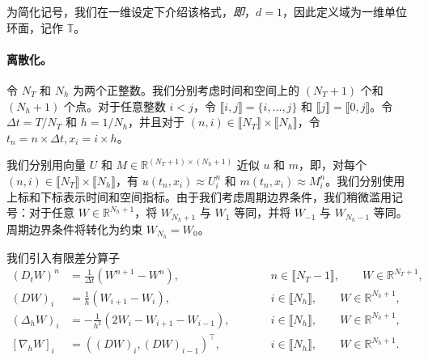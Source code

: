 \documentclass{amsproc}
\theoremstyle{definition}
\theoremstyle{remark}
\numberwithin{equation}{section}
\newcommand{\RR}{{\mathbb R}}
\newcommand{\TT}{{\mathbb T}}
\newcommand{\grad}{\nabla}
\begin{document}
为简化记号，我们在一维设定下介绍该格式，\textit{即}，$d=1$，因此定义域为一维单位环面，记作 $\TT$。






\paragraph{\textbf{离散化。} }

令 $N_T$ 和 $N_h$ 为两个正整数。我们分别考虑时间和空间上的 $(N_T+1)$ 个和 $(N_h+1)$ 个点。对于任意整数 $i < j$，令 $\llbracket i,j \rrbracket = \{i,\dots,j\}$ 和 $\llbracket j \rrbracket = \llbracket 0, j \rrbracket$。令 $\Delta t = T/N_T$ 和 $h = 1/N_h$，并且对于 $(n,i) \in \llbracket N_T \rrbracket \times \llbracket N_h \rrbracket$，令 $t_n = n \times \Delta t, x_i = i \times h$。

我们分别用向量 $U$ 和 $M \in \RR^{(N_T+1)\times(N_h+1)}$ 近似 $u$ 和 $m$，即，对每个 $(n,i) \in \llbracket N_T \rrbracket \times \llbracket N_h \rrbracket$，有 $u(t_n,x_i) \approx U^{n}_{i}$ 和 $m(t_n,x_i) \approx M^{n}_{i}$。我们分别使用上标和下标表示时间和空间指标。由于我们考虑周期边界条件，我们稍微滥用记号：对于任意 $W \in \RR^{N_h+1}$，将 $W_{N_h+1}$ 与 $W_1$ 等同，并将 $W_{-1}$ 与 $W_{N_h-1}$ 等同。周期边界条件将转化为约束 $W_{N_h} = W_0$。


我们引入有限差分算子
\begin{align*}
	(D_t W)^n &= \frac{1}{\Delta t}(W^{n+1} - W^n), \qquad &&n \in \llbracket N_T-1 \rrbracket, \qquad W \in \RR^{N_T+1},
	\\
	(D W)_i &= \frac{1}{h} (W_{i+1} - W_{i}), \qquad &&i  \in \llbracket N_h \rrbracket, \qquad W \in \RR^{N_h+1},
	\\
	(\Delta_h W)_i &= -\frac{1}{h^2} \left(2 W_i - W_{i+1} - W_{i-1}\right), \qquad &&i \in \llbracket N_h \rrbracket, \qquad W \in \RR^{N_h+1},
	\\
	[\grad_h W]_i &= \left( (D W)_{i}, (D W)_{i-1} \right)^\top, \qquad &&i \in \llbracket N_h \rrbracket, \qquad W \in \RR^{N_h+1}.
\end{align*}
\end{document}
